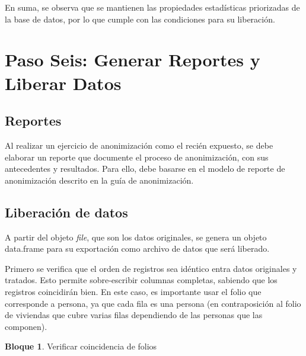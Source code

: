 \documentclass[]{book}
\newenvironment{Shaded}{\begin{snugshade}}{\end{snugshade}}
\newcommand{\CommentTok}[1]{\textcolor[rgb]{0.56,0.35,0.01}{\textit{#1}}}
\newcommand{\KeywordTok}[1]{\textcolor[rgb]{0.13,0.29,0.53}{\textbf{#1}}}
\newcommand{\NormalTok}[1]{#1}
\newcommand{\OperatorTok}[1]{\textcolor[rgb]{0.81,0.36,0.00}{\textbf{#1}}}
\newcommand{\StringTok}[1]{\textcolor[rgb]{0.31,0.60,0.02}{#1}}
\theoremstyle{definition}
\theoremstyle{definition}
\newtheorem{example}{Bloque}[chapter]
\theoremstyle{definition}
\theoremstyle{definition}
\theoremstyle{remark}
\begin{document}
En suma, se observa que se mantienen las propiedades estadísticas priorizadas de la base de datos, por lo que cumple con las condiciones para su liberación.

\hypertarget{paso-seis-generar-reportes-y-liberar-datos}{%
\section{Paso Seis: Generar Reportes y Liberar Datos}\label{paso-seis-generar-reportes-y-liberar-datos}}

\hypertarget{reportes}{%
\subsection{Reportes}\label{reportes}}

Al realizar un ejercicio de anonimización como el recién expuesto, se debe elaborar un reporte que documente el proceso de anonimización, con sus antecedentes y resultados. Para ello, debe basarse en el modelo de reporte de anonimización descrito en la guía de anonimización.

\hypertarget{liberaciuxf3n-de-datos}{%
\subsection{Liberación de datos}\label{liberaciuxf3n-de-datos}}

A partir del objeto \emph{file}, que son los datos originales, se genera un objeto data.frame para su exportación como archivo de datos que será liberado.

Primero se verifica que el orden de registros sea idéntico entra datos originales y tratados. Esto permite sobre-escribir columnas completas, sabiendo que los registros coincidirán bien. En este caso, es importante usar el folio que corresponde a persona, ya que cada fila es una persona (en contraposición al folio de viviendas que cubre varias filas dependiendo de las personas que las componen).

\begin{example}
\protect\hypertarget{exm:bloque92nbm}{}{\label{exm:bloque92nbm} }Verificar coincidencia de folios
\end{example}

\begin{Shaded}
\end{Shaded}
\end{document}
